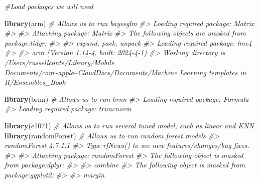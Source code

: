 \documentclass[
]{book}
\newenvironment{Shaded}{\begin{snugshade}}{\end{snugshade}}
\newcommand{\CommentTok}[1]{\textcolor[rgb]{0.56,0.35,0.01}{\textit{#1}}}
\newcommand{\FunctionTok}[1]{\textcolor[rgb]{0.13,0.29,0.53}{\textbf{#1}}}
\newcommand{\NormalTok}[1]{#1}
\begin{document}
\begin{Shaded}
\begin{Highlighting}[]

\CommentTok{\#Load packages we will need}

\FunctionTok{library}\NormalTok{(arm) }\CommentTok{\# Allows us to run bayesglm}
\CommentTok{\#\textgreater{} Loading required package: Matrix}
\CommentTok{\#\textgreater{} }
\CommentTok{\#\textgreater{} Attaching package: \textquotesingle{}Matrix\textquotesingle{}}
\CommentTok{\#\textgreater{} The following objects are masked from \textquotesingle{}package:tidyr\textquotesingle{}:}
\CommentTok{\#\textgreater{} }
\CommentTok{\#\textgreater{}     expand, pack, unpack}
\CommentTok{\#\textgreater{} Loading required package: lme4}
\CommentTok{\#\textgreater{} }
\CommentTok{\#\textgreater{} arm (Version 1.14{-}4, built: 2024{-}4{-}1)}
\CommentTok{\#\textgreater{} Working directory is /Users/russellconte/Library/Mobile Documents/com\textasciitilde{}apple\textasciitilde{}CloudDocs/Documents/Machine Learning templates in R/Ensembles\_Book}
\end{Highlighting}
\end{Shaded}

\begin{Shaded}
\begin{Highlighting}[]
\FunctionTok{library}\NormalTok{(brnn) }\CommentTok{\# Allows us to run brnn}
\CommentTok{\#\textgreater{} Loading required package: Formula}
\CommentTok{\#\textgreater{} Loading required package: truncnorm}
\end{Highlighting}
\end{Shaded}

\begin{Shaded}
\begin{Highlighting}[]
\FunctionTok{library}\NormalTok{(e1071) }\CommentTok{\# Allows us to run several tuned model, such as linear and KNN}
\FunctionTok{library}\NormalTok{(randomForest) }\CommentTok{\# Allows us to run random forest models}
\CommentTok{\#\textgreater{} randomForest 4.7{-}1.1}
\CommentTok{\#\textgreater{} Type rfNews() to see new features/changes/bug fixes.}
\CommentTok{\#\textgreater{} }
\CommentTok{\#\textgreater{} Attaching package: \textquotesingle{}randomForest\textquotesingle{}}
\CommentTok{\#\textgreater{} The following object is masked from \textquotesingle{}package:dplyr\textquotesingle{}:}
\CommentTok{\#\textgreater{} }
\CommentTok{\#\textgreater{}     combine}
\CommentTok{\#\textgreater{} The following object is masked from \textquotesingle{}package:ggplot2\textquotesingle{}:}
\CommentTok{\#\textgreater{} }
\CommentTok{\#\textgreater{}     margin}
\end{Highlighting}
\end{Shaded}
\end{document}
